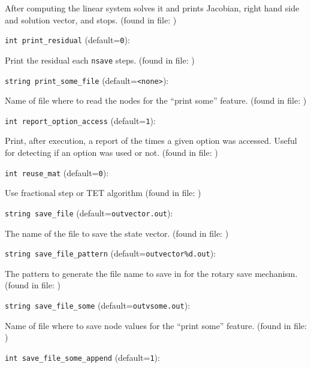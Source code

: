 After computing the linear system solves it and prints Jacobian,
right hand side and solution vector, and stops. 
 (found in file: \verb++)
\item\verb+int print_residual+ {\rm(default=\verb|0|)}:

Print the residual each  \verb+nsave+  steps. 
 (found in file: \verb++)
\item\verb+string print_some_file+ {\rm(default=\verb|<none>|)}:

Name of file where to read the nodes for the ``print some'' 
feature. 
 (found in file: \verb++)
\item\verb+int report_option_access+ {\rm(default=\verb|1|)}:

Print, after execution, a report of the times a given option
was accessed. Useful for detecting if an option was used or not.
 (found in file: \verb++)
\item\verb+int reuse_mat+ {\rm(default=\verb|0|)}:

Use fractional step or TET algorithm
 (found in file: \verb++)
\item\verb+string save_file+ {\rm(default=\verb|outvector.out|)}:

The name of the file to save the state vector. 
 (found in file: \verb++)
\item\verb+string save_file_pattern+ {\rm(default=\verb|outvector%d.out|)}:

The pattern to generate the file name to save in for
the rotary save mechanism.
 (found in file: \verb++)
\item\verb+string save_file_some+ {\rm(default=\verb|outvsome.out|)}:

Name of file where to save node values for the ``print some'' 
feature. 
 (found in file: \verb++)
\item\verb+int save_file_some_append+ {\rm(default=\verb|1|)}:

